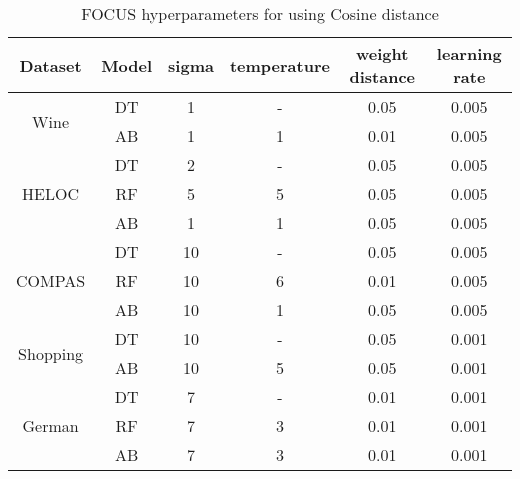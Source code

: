 \begin{table}[htb]
\centering
\begin{tabular}{cccccc}
Dataset                   & Model & sigma & temperature & weight distance & learning rate \\ \hline
\multirow{2}{*}{Wine}     & DT    & 1     & -          & 0.05            & 0.005         \\
                          & AB    & 1     & 1           & 0.01            & 0.005         \\ \hline
\multirow{3}{*}{HELOC}    & DT    & 2     & -          & 0.05            & 0.005         \\
                          & RF    & 5     & 5           & 0.05            & 0.005         \\
                          & AB    & 1     & 1           & 0.05            & 0.005         \\ \hline
\multirow{3}{*}{COMPAS}   & DT    & 10    & -          & 0.05            & 0.005         \\
                          & RF    & 10    & 6           & 0.01            & 0.005         \\
                          & AB    & 10    & 1           & 0.05            & 0.005         \\ \hline
\multirow{2}{*}{Shopping} & DT    & 10    & -          & 0.05            & 0.001         \\
                          & AB    & 10    & 5           & 0.05            & 0.001         \\ \hline
\multirow{3}{*}{German}   & DT    & 7     & -           & 0.01            & 0.001         \\
                          & RF    & 7     & 3           & 0.01            & 0.001         \\
                          & AB    & 7     & 3           & 0.01            & 0.001         \\ \hline
\end{tabular}
\caption{FOCUS hyperparameters for using Cosine distance}
\label{table:cosine params}
\end{table}

